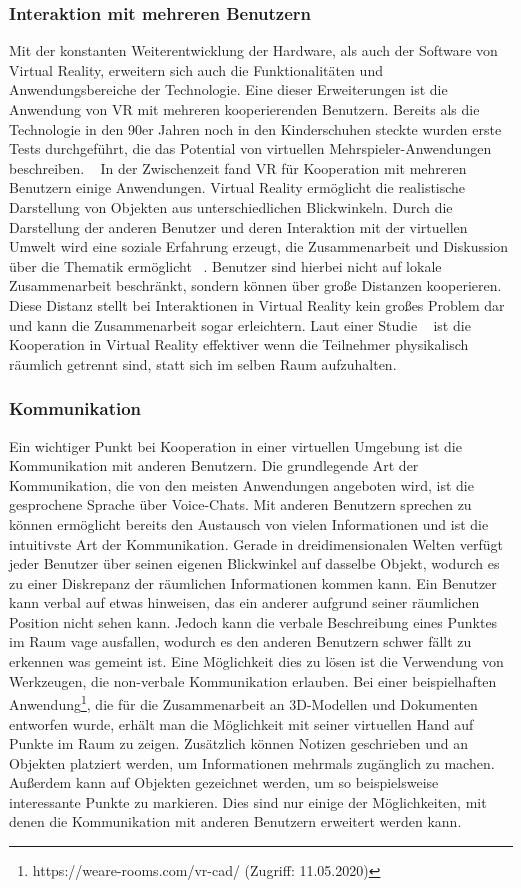\subsubsection{Interaktion mit mehreren Benutzern}
Mit der konstanten Weiterentwicklung der Hardware, als auch der Software von Virtual Reality, erweitern sich auch die Funktionalitäten und Anwendungsbereiche der Technologie. Eine dieser Erweiterungen ist die Anwendung von VR mit mehreren kooperierenden Benutzern. Bereits als die Technologie in den 90er Jahren noch in den Kinderschuhen steckte wurden erste Tests durchgeführt, die das Potential von virtuellen Mehrspieler-Anwendungen beschreiben. ~\parencite{youngblut1998educational}\newline
In der Zwischenzeit fand VR für Kooperation mit mehreren Benutzern einige Anwendungen. Virtual Reality ermöglicht die realistische Darstellung von Objekten aus unterschiedlichen Blickwinkeln. Durch die Darstellung der anderen Benutzer und deren Interaktion mit der virtuellen Umwelt wird eine soziale Erfahrung erzeugt, die Zusammenarbeit und Diskussion über die Thematik ermöglicht ~\parencite{8798289}. Benutzer sind hierbei nicht auf lokale Zusammenarbeit beschränkt, sondern können über große Distanzen kooperieren. Diese Distanz stellt bei Interaktionen in Virtual Reality kein großes Problem dar und kann die Zusammenarbeit sogar erleichtern. Laut einer Studie ~\parencite{8848001} ist die Kooperation in Virtual Reality effektiver wenn die Teilnehmer physikalisch räumlich getrennt sind, statt sich im selben Raum aufzuhalten. 

\subsubsection{Kommunikation}
Ein wichtiger Punkt bei Kooperation in einer virtuellen Umgebung ist die Kommunikation mit anderen Benutzern. Die grundlegende Art der Kommunikation, die von den meisten Anwendungen angeboten wird, ist die gesprochene Sprache über Voice-Chats. Mit anderen Benutzern sprechen zu können ermöglicht bereits den Austausch von vielen Informationen und ist die intuitivste Art der Kommunikation. Gerade in dreidimensionalen Welten verfügt jeder Benutzer über seinen eigenen Blickwinkel auf dasselbe Objekt, wodurch es zu einer Diskrepanz der räumlichen Informationen kommen kann. Ein Benutzer kann verbal auf etwas hinweisen, das ein anderer aufgrund seiner räumlichen Position nicht sehen kann. Jedoch kann die verbale Beschreibung eines Punktes im Raum vage ausfallen, wodurch es den anderen Benutzern schwer fällt zu erkennen was gemeint ist. Eine Möglichkeit dies zu lösen ist die Verwendung von Werkzeugen, die non-verbale Kommunikation erlauben. Bei einer beispielhaften Anwendung\footnote{https://weare-rooms.com/vr-cad/ (Zugriff: 11.05.2020)}, die für die Zusammenarbeit an 3D-Modellen und Dokumenten entworfen wurde, erhält man die Möglichkeit mit seiner virtuellen Hand auf Punkte im Raum zu zeigen. Zusätzlich können Notizen geschrieben und an Objekten platziert werden, um Informationen mehrmals zugänglich zu machen. Außerdem kann auf Objekten gezeichnet werden, um so beispielsweise interessante Punkte zu markieren. Dies sind nur einige der Möglichkeiten, mit denen die Kommunikation mit anderen Benutzern erweitert werden kann.

